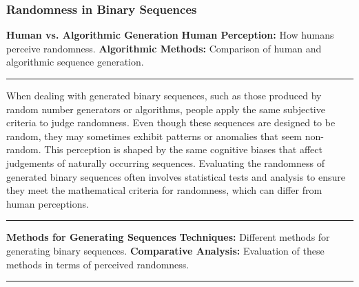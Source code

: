 \subsubsection{Randomness in Binary Sequences}
\textbf{Human vs. Algorithmic Generation}\newline
\textbf{Human Perception:} How humans perceive randomness.\newline
\textbf{Algorithmic Methods:} Comparison of human and algorithmic sequence generation.\newline
\noindent\rule{\textwidth}{0.1pt}
When dealing with generated binary sequences, such as those produced by random number generators or algorithms, people apply the same subjective criteria to judge randomness. Even though these sequences are designed to be random, they may sometimes exhibit patterns or anomalies that seem non-random. This perception is shaped by the same cognitive biases that affect judgements of naturally occurring sequences. Evaluating the randomness of generated binary sequences often involves statistical tests and analysis to ensure they meet the mathematical criteria for randomness, which can differ from human perceptions.\newline
\noindent\rule{\textwidth}{0.1pt}

\noindent\textbf{Methods for Generating Sequences}\newline
\textbf{Techniques:} Different methods for generating binary sequences.\newline
\textbf{Comparative Analysis:} Evaluation of these methods in terms of perceived randomness.\newline
\noindent\rule{\textwidth}{0.1pt}